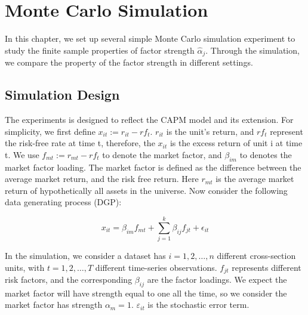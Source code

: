 \chapter{Monte Carlo Simulation}\label{MC}
	In this chapter, we set up several simple Monte Carlo simulation experiment to study the finite sample properties of factor strength $\hat{\alpha}_j$.
	Through the simulation, we compare the property of the factor strength in different settings.
	
\section{Simulation Design}
The experiments is designed to reflect the CAPM model and its extension.
For simplicity, we first define $x_{it} := r_{it}- rf_{t}$.
$r_{it}$ is the unit's return, and $rf_{t}$ represent the risk-free rate at time t, therefore, the $x_{it}$ is the excess return of unit i at time t.
We use $f_{mt}:=r_{mt} - rf_{t}$ to denote the market factor, and $\beta_{im}$ to denotes the market factor loading.
The market factor is defined as the difference between the average market return, and the risk free return.
Here $r_{mt}$ is the average market return of hypothetically all assets in the universe.
Now consider the following data generating process (DGP):
	
		\[ x_{it} = \beta_{im}f_{mt} +  \sum_{j=1}^k\beta_{ij}f_{jt} +\epsilon_{it}  \]
	


In the simulation, we consider a dataset has $i = 1, 2,\dots, n$ different cross-section units, with $t= 1, 2,\dots, T$ different time-series observations. 
$f_{jt}$ represents different risk factors, and the corresponding  $\beta_{ij}$ are the factor loadings.
We expect the market factor will have strength equal to one all the time, so we consider the market factor has strength $\alpha_m = 1$.
$\varepsilon_{it}$ is the stochastic error term.

